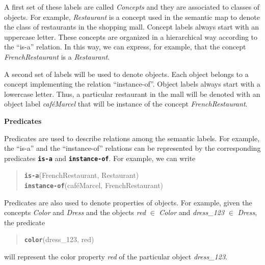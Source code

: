 A first set of these labels are called \emph{Concepts} and they are associated to classes of objects. For example, \emph{Restaurant} is a concept used in the semantic map to denote the class of restaurants in the shopping mall. Concept labels always start with an uppercase letter.
These concepts are organized in a hierarchical way according to the ``is-a'' relation.
In this way, we can express, for example, that the concept \emph{FrenchRestaurant} is a \emph{Restaurant}. 

A second set of labels will be used to denote objects. Each object belongs to a concept implementing the relation ``instance-of''. Object labels always start with a lowercase letter.
Thus, a particular restaurant in the mall will be denoted with an object label \emph{caf\'eMarcel} that will be instance of the concept \emph{FrenchRestaurant}. 

\vspace{1em}

\noindent 
\textbf{Predicates}

Predicates are used to describe relations among the semantic labels. For example, the ``is-a'' and the ``instance-of'' relations can be represented by the corresponding predicates {\tt\bf is-a} and {\tt\bf instance-of}. For example, we can write

\begin{quote}
{\tt\bf is-a}(FrenchRestaurant, Restaurant)\\
{\tt\bf instance-of}(caf\'eMarcel, FrenchRestaurant)\\
\end{quote}



Predicates are also used to denote properties of objects. For example, given the concepts \emph{Color} and \emph{Dress} and the objects \emph{red} $\in$ \emph{Color} and \emph{dress\_123} $\in$ \emph{Dress}, the predicate 

\begin{quote}
{\tt\bf color}(dress\_123,  red)
\end{quote}

\noindent
will represent the color property \emph{red} of the particular object  \emph{dress\_123}.


